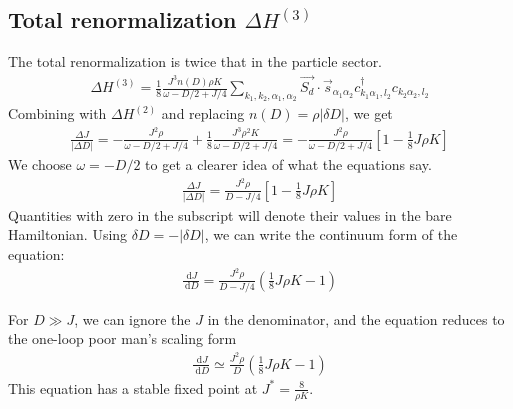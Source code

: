 \subsection{Total renormalization \(\Delta H^{(3)}\)}
The total renormalization is twice that in the particle sector.
\begin{equation}\begin{aligned}
	\Delta H^{(3)} = \frac{1}{8}\frac{J^3 n(D) \rho K}{\omega - D/2 + J/4} \sum_{k_1,k_2,\alpha_1,\alpha_2} \vec{S_d}\cdot\vec{s}_{\alpha_1 \alpha_2} c^\dagger_{k_1\alpha_1,l_2}c_{k_2 \alpha_2,l_2}
\end{aligned}\end{equation}
Combining with \(\Delta H^{(2)}\) and replacing \(n(D) = \rho |\delta D|\), we get
\begin{equation}\begin{aligned}
	\frac{\Delta J}{|\Delta D|} = -\frac{J^2 \rho}{\omega - D/2 + J/4} + \frac{1}{8}\frac{J^3 \rho^2 K}{\omega - D/2 + J/4} = -\frac{J^2 \rho}{\omega - D/2 + J/4}\left[1 - \frac{1}{8}J\rho K\right] 
\end{aligned}\end{equation}
We choose \(\omega = -D/2\) to get a clearer idea of what the equations say. 
\begin{equation}\begin{aligned}
	\label{mchannel}
	\frac{\Delta J}{|\Delta D|} = \frac{J^2 \rho}{D - J/4}\left[1 - \frac{1}{8}J\rho K\right] 
\end{aligned}\end{equation}
Quantities with zero in the subscript will denote their values in the bare Hamiltonian. Using \(\delta D = -|\delta D|\), we can write the continuum form of the equation:
\begin{equation}\begin{aligned}
	\frac{\:\mathrm{d}J}{\:\mathrm{d}D} = \frac{J^2 \rho}{D - J/4}\left(\frac{1}{8}J\rho K - 1\right)
\end{aligned}\end{equation}

For \(D \gg J\), we can ignore the \(J\) in the denominator, and the equation reduces to the one-loop poor man's scaling form
\begin{equation}\begin{aligned}
	\label{pms_mchannel}
	\frac{\:\mathrm{d}J}{\:\mathrm{d}D} \simeq  \frac{J^2 \rho}{D}\left(\frac{1}{8}J\rho K - 1\right)
\end{aligned}\end{equation}
This equation has a stable fixed point at \(J^* = \frac{8}{\rho K}\).

